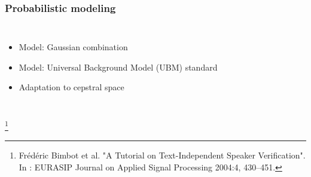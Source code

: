 \documentclass[11pt,english]{beamer}
\newcommand\blfootnote[1]{%
 \begingroup
  \renewcommand\thefootnote{}\footnote{#1}%
  \addtocounter{footnote}{-1}%
  \endgroup
}
\begin{document}
\begin{frame}
  \frametitle{Probabilistic modeling}
  \begin{columns}
    \begin{itemize}
    \item Model: Gaussian combination
    \item Model: Universal Background Model (UBM) standard
    \item<2> Adaptation to cepstral space
    \end{itemize}
  \end{columns}
 
\blfootnote{Frédéric Bimbot et al. "A Tutorial on Text-Independent Speaker Verification".  In : EURASIP Journal on Applied Signal Processing 2004:4, 430–451.}

\end{frame}
\end{document}

